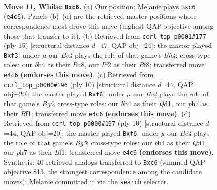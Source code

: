 \documentclass[11pt]{article}
\begin{document}
\clearpage

\begin{figure}[p]\centering
\begin{subfigure}{0.46\textwidth}\centering
\resizebox{\linewidth}{!}{%
\newchessgame
\chessboard[
  setfen={r2qk2r/pppb1ppp/2n1p3/8/1bPPB3/5N2/PP2KPPP/R1BQ3R w kq - 3 11},
  showmover=false,
  pgfstyle=straightmove, color=movearrow, markmove={e4-c6}
]}
\caption{}
\end{subfigure}\hfill
\begin{subfigure}{0.46\textwidth}\centering
\resizebox{\linewidth}{!}{%
\newchessgame
\chessboard[
  setfen={r2qkbnr/pp1n1ppp/2p1p3/7b/3PNB2/5N1P/PPP1BPP1/R2QK2R b KQkq - 1 8},
  showmover=false,
  pgfstyle=straightmove, color=movearrow, markmove={h5-f3}
]}
\caption{}
\end{subfigure}
\\[4pt]
\begin{subfigure}{0.46\textwidth}\centering
\resizebox{\linewidth}{!}{%
\newchessgame
\chessboard[
  setfen={rnbqk2r/ppp1bppp/4pn2/6B1/3PN3/8/PPP2PPP/R2QKBNR w KQkq - 1 6},
  showmover=false,
  pgfstyle=straightmove, color=movearrow, markmove={g5-f6}
]}
\caption{}
\end{subfigure}\hfill
\begin{subfigure}{0.46\textwidth}\centering
\resizebox{\linewidth}{!}{%
\newchessgame
\chessboard[
  setfen={rnbqk2r/ppp1bppp/4pn2/6B1/3PN3/8/PPP2PPP/R2QKBNR w KQkq - 1 6},
  showmover=false,
  pgfstyle=straightmove, color=movearrow, markmove={g5-f6}
]}
\caption{}
\end{subfigure}
\caption{\textbf{Move 11, White: \texttt{Bxc6}.} (a) Our position; Melanie plays \texttt{Bxc6} (\texttt{e4c6}). Panels (b)--(d) are the retrieved master positions whose correspondence most drove this move (highest QAP objective among those that transfer to it). (b) Retrieved from \texttt{ccrl\_top\_p0001\#177} (ply 15) [structural distance $d$=47, QAP obj=24]: the master played \texttt{Bxf3}; under $\mu$ our \emph{Be4} plays the role of that game's \emph{Bh4}; cross-type roles: our \emph{b}b4 as their \emph{R}a8, our \emph{P}f2 as their \emph{B}f8; transferred move \texttt{e4c6} \textbf{(endorses this move)}. (c) Retrieved from \texttt{ccrl\_top\_p0000\#196} (ply 10) [structural distance $d$=44, QAP obj=20]: the master played \texttt{Bxf6}; under $\mu$ our \emph{Be4} plays the role of that game's \emph{Bg5}; cross-type roles: our \emph{b}b4 as their \emph{Q}d1, our \emph{p}h7 as their \emph{B}f1; transferred move \texttt{e4c6} \textbf{(endorses this move)}. (d) Retrieved from \texttt{ccrl\_top\_p0000\#197} (ply 10) [structural distance $d$=44, QAP obj=20]: the master played \texttt{Bxf6}; under $\mu$ our \emph{Be4} plays the role of that game's \emph{Bg5}; cross-type roles: our \emph{b}b4 as their \emph{Q}d1, our \emph{p}h7 as their \emph{B}f1; transferred move \texttt{e4c6} \textbf{(endorses this move)}. Synthesis: 40 retrieved analogs transferred to \texttt{Bxc6} (summed QAP objective 813, the strongest correspondence among the candidate moves); Melanie committed it via the \texttt{search} selector.}
\label{fig:thought-m20}
\end{figure}
\end{document}
